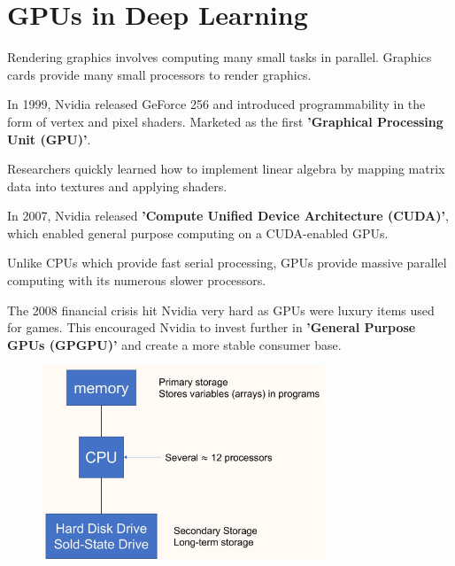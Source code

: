 \documentclass{report}
\begin{document}
\section{GPUs in Deep Learning}

\begin{concept}
    Rendering graphics involves computing many small tasks in parallel. Graphics cards provide many small processors to render graphics.

    In 1999, Nvidia released GeForce 256 and introduced programmability in the form of vertex and pixel shaders. Marketed as the first \textbf{'Graphical Processing Unit (GPU)'}.

    Researchers quickly learned how to implement linear algebra by mapping matrix data into textures and applying shaders.

    In 2007, Nvidia released \textbf{'Compute Unified Device Architecture (CUDA)'}, which enabled general purpose computing on a CUDA-enabled GPUs.

    Unlike CPUs which provide fast serial processing, GPUs provide massive parallel computing with its numerous slower processors.

    The 2008 financial crisis hit Nvidia very hard as GPUs were luxury items used for games. This encouraged Nvidia to invest further in \textbf{'General Purpose GPUs (GPGPU)'} and create a more stable consumer base.
\end{concept}

\begin{concept}
    \begin{figure}[H]
        \centering
        \includegraphics[width=0.75\textwidth]{.././assets/4.6.jpg}
    \end{figure}
\end{concept}
\end{document}
